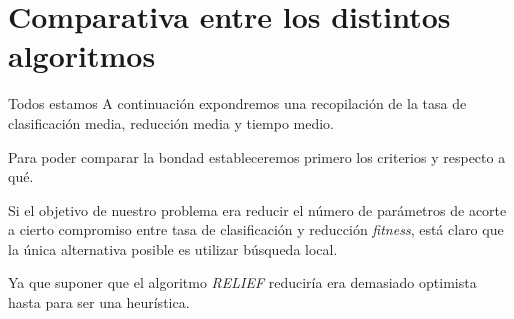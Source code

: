 
\section{Comparativa entre los distintos algoritmos}

Todos estamos 
A continuación expondremos una recopilación de la tasa de clasificación media, reducción media  y tiempo medio.


\begin{table}[h]
    \centering
    \caption{Comparativas tasa de clasificación media, reducción media  y tiempo medio distintos algoritmos.}
    \label{Tabla:comparativas final}
\end{table}

Para poder comparar la bondad estableceremos primero los criterios 
y respecto a qué. 

Si el objetivo de nuestro problema era reducir el número de parámetros de acorte
a cierto compromiso entre tasa de clasificación y reducción \textit{fitness}, está claro 
que la única alternativa posible es utilizar búsqueda local.

Ya que suponer que el algoritmo \textit{RELIEF} reduciría era demasiado optimista hasta para ser una heurística.

